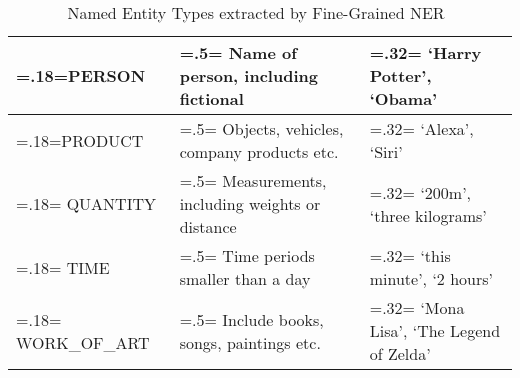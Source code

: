 \begin{table}[H]
\begin{tabularx}{\textwidth}{|>{\hsize=.18\hsize\linewidth=\hsize}X|>{\hsize=.5\hsize\linewidth=\hsize}X|>{\hsize=.32\hsize\linewidth=\hsize}X|}
        \hline
        PERSON & Name of person, including fictional & `Harry Potter', `Obama' \\
        \hline
        PRODUCT & Objects, vehicles, company products etc. & `Alexa', `Siri'\\
        \hline
        QUANTITY &  Measurements, including weights or distance & `200m', `three kilograms' \\
        \hline
        TIME & Time periods smaller than a day & `this minute', `2 hours'\\
        \hline
        WORK\_OF\_ART &  Include books, songs, paintings etc. & `Mona Lisa', `The Legend of Zelda'\\
    \hline
    \end{tabularx}
    \caption{Named Entity Types extracted by Fine-Grained NER~\cite{lample}}
    \label{appendix:semantic_types}
    \end{table}
